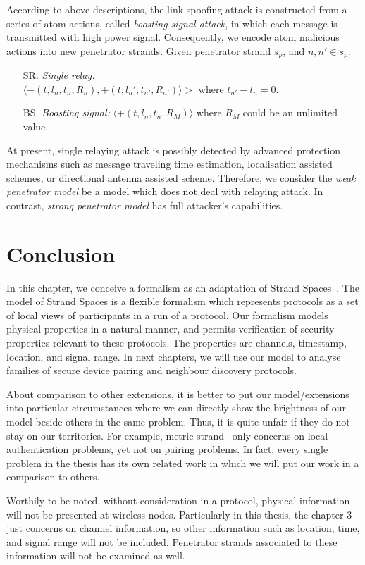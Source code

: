 According to above descriptions, the link spoofing attack is constructed from a series of atom actions, called \emph{boosting signal attack}, in which each message is transmitted with high power signal. Consequently, we encode atom malicious actions into new penetrator strands. Given penetrator strand $s_p$, and $n, n' \in s_p$. 
\begin{itemize}
\item[SR.] \emph{Single relay:} \\ $\langle -(t, l_n, t_n, R_n), +(t, l_n', t_{n'}, R_{n'}) \rangle >$ where $t_{n'} - t_n = 0$.
\item [BS.] \emph{Boosting signal:} $\langle +(t, l_n, t_n, R_M) \rangle$ where $R_M$ could be an unlimited value. 
\end{itemize}

At present, single relaying attack is possibly detected by advanced protection mechanisms such as message traveling time estimation, localisation assisted schemes, or directional antenna assisted scheme. Therefore, we consider the \emph{weak penetrator model} be a model which does not deal with relaying attack. In contrast, \emph{strong penetrator model} has full attacker's capabilities. 

\section{Conclusion}

In this chapter, we conceive a formalism as an adaptation of Strand Spaces~\cite{674832}. The model of Strand Spaces is a flexible formalism which represents protocols as a set of local views of participants in a run of a protocol. Our formalism models physical properties in a natural manner, and permits verification of security properties relevant to these protocols. The properties are channels, timestamp, location, and signal range. In next chapters, we will use our model to analyse families of secure device pairing and neighbour discovery protocols.

About comparison to other extensions, it is better to put our model/extensions into particular circumstances where we can directly show the brightness of our model beside others in the same problem. Thus, it is quite unfair if they do not stay on our territories. For example, metric strand~\cite{Thayer:2010aa} only concerns on local authentication problems, yet not on pairing problems. In fact, every single problem in the thesis has its own related work in which we will put our work in a comparison to others. 

Worthily to be noted, without consideration in a protocol, physical information will not be presented at wireless nodes. Particularly in this thesis, the chapter 3 just concerns on channel information, so other information such as location, time, and signal range will not be included. Penetrator strands associated to these information will not be examined as well.




